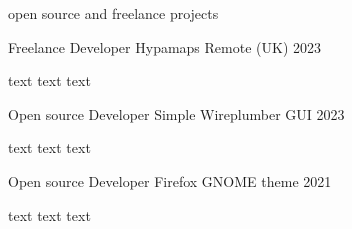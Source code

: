 


\begin{cvparagraph}
open source and freelance projects

\end{cvparagraph}



\begin{cventries}

\cventry
{Freelance Developer} %
{Hypamaps} %
{Remote (UK)} %
{2023} %
{
  \begin{cvitems} %
    text text text
  \end{cvitems}
}


\cventry
{Open source Developer} %
{Simple Wireplumber GUI} %
{} %
{2023} %
{
  \begin{cvitems} %
    text text text
  \end{cvitems}
}

\cventry
{Open source Developer} %
{Firefox GNOME theme} %
{} %
{2021} %
{
  \begin{cvitems} %
    text text text
  \end{cvitems}
}

\end{cventries}


